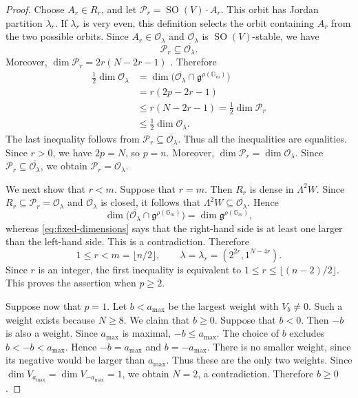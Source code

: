 \documentclass[10pt,a4paper]{amsart}
\newcommand{\Gm}{\mathbb G_m}
\begin{document}
\begin{proof}
Choose $A_r\in R_r$, and let
$\mathcal P_r=\operatorname{SO}(V)\cdot A_r$. This orbit has Jordan
partition $\lambda_r$. If $\lambda_r$ is very even, this definition
selects the orbit containing $A_r$ from the two possible orbits. Since
$A_r\in\overline{\mathcal O_\lambda}$ and
$\overline{\mathcal O_\lambda}$ is $\operatorname{SO}(V)$-stable, we
have
\[
\mathcal P_r\subseteq\overline{\mathcal O_\lambda}.
\]
Moreover,
$\dim\mathcal P_r=2r(N-2r-1)$ \cite{KP}. Therefore
\[
\begin{aligned}
\frac12\dim\mathcal O_\lambda
&=\dim\bigl(\overline{\mathcal O_\lambda}
\cap\mathfrak g^{\rho(\Gm)}\bigr)\\
&=r(2p-2r-1)\\
&\leq r(N-2r-1)
=\frac12\dim\mathcal P_r\\
&\leq\frac12\dim\mathcal O_\lambda.
\end{aligned}
\]
The last inequality follows from
$\mathcal P_r\subseteq\overline{\mathcal O_\lambda}$. Thus all the
inequalities are equalities. Since $r>0$, we have $2p=N$, so $p=n$.
Moreover,
$\dim\mathcal P_r=\dim\mathcal O_\lambda$. Since
$\mathcal P_r\subseteq\overline{\mathcal O_\lambda}$, we obtain
$\mathcal P_r=\mathcal O_\lambda$.

We next show that $r<m$. Suppose that $r=m$. Then $R_r$ is dense in
$\Lambda^2W$. Since
$R_r\subseteq\mathcal P_r=\mathcal O_\lambda$ and
$\overline{\mathcal O_\lambda}$ is closed, it follows that
$\Lambda^2W\subseteq\overline{\mathcal O_\lambda}$. Hence
\[
\dim\bigl(\overline{\mathcal O_\lambda}
\cap\mathfrak g^{\rho(\Gm)}\bigr)
=\dim\mathfrak g^{\rho(\Gm)},
\]
whereas \eqref{eq:fixed-dimensions} says that the right-hand side is
at least one larger than the left-hand side. This is a contradiction.
Therefore
\[
1\leq r<m=\lfloor n/2\rfloor,
\qquad
\lambda=\lambda_r=(2^{2r},1^{N-4r}).
\]
Since $r$ is an integer, the first inequality is equivalent to
$1\leq r\leq\lfloor(n-2)/2\rfloor$.
This proves the assertion when $p\geq2$.

Suppose now that $p=1$. Let $b<a_{\max}$ be the largest weight with
$V_b\ne0$. Such a weight exists because $N\geq8$. We claim that
$b\geq0$. Suppose that $b<0$. Then $-b$ is also a weight. Since
$a_{\max}$ is maximal, $-b\leq a_{\max}$. The choice of $b$ excludes
$b<-b<a_{\max}$. Hence $-b=a_{\max}$ and $b=-a_{\max}$.
There is no smaller weight, since its negative would be larger than
$a_{\max}$. Thus these are the only two weights. Since
$\dim V_{a_{\max}}=\dim V_{-a_{\max}}=1$, we obtain $N=2$, a
contradiction. Therefore $b\geq0$.


\end{proof}
\end{document}
